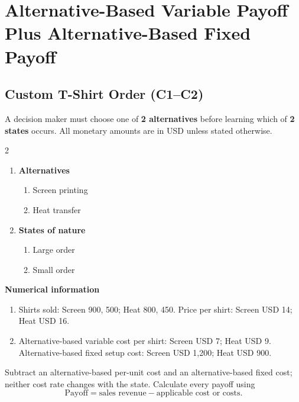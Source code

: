 \section{Alternative-Based Variable Payoff Plus Alternative-Based Fixed Payoff}
\label{sec:alternative-based-variable-payoff-plus-alternative-based-fixed-payoff}
\subsection{Custom T-Shirt Order (C1--C2)}
\label{sec:problem13-custom-t-shirt-order-c1-c2}
A decision maker must choose one of \textbf{2 alternatives} before learning which of \textbf{2 states} occurs. All monetary amounts are in USD unless stated otherwise.
\begin{multicols}{2}
\begin{enumerate}[label=\arabic*.]
 \item \textbf{Alternatives}
 \begin{enumerate}[label=\roman*)]
  \item Screen printing
  \item Heat transfer
 \end{enumerate}
 \item \textbf{States of nature}
 \begin{enumerate}[label=\roman*)]
  \item Large order
  \item Small order
 \end{enumerate}
\end{enumerate}
\end{multicols}
 \textbf{Numerical information}
 \begin{enumerate}[label=\roman*)]
  \item Shirts sold: Screen 900, 500; Heat 800, 450. Price per shirt: Screen USD 14; Heat USD 16.
  \item Alternative-based variable cost per shirt: Screen USD 7; Heat USD 9. Alternative-based fixed setup cost: Screen USD 1,200; Heat USD 900.
 \end{enumerate}
Subtract an alternative-based per-unit cost and an alternative-based fixed cost; neither cost rate changes with the state. Calculate every payoff using
\[
 \text{Payoff}=\text{sales revenue}-\text{applicable cost or costs}.
\]

